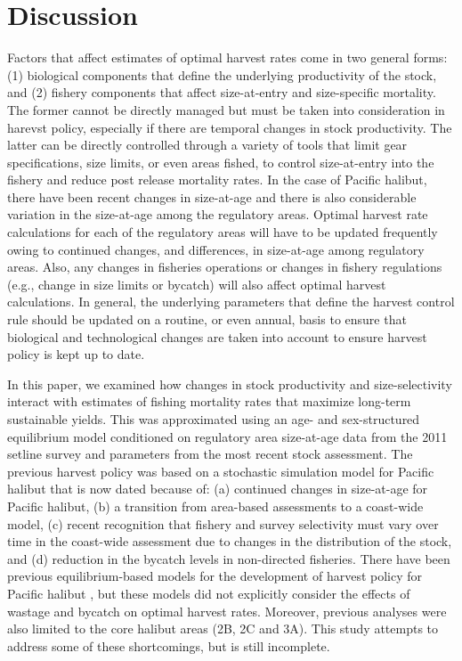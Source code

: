 

\section*{Discussion} %
\label{sec:discussion}

Factors that affect estimates of optimal harvest rates come in two general forms: (1) biological components that define the underlying productivity of the stock, and (2) fishery components that affect size-at-entry and size-specific mortality. The former cannot be directly managed but must be taken into consideration in harevst policy, especially if there are temporal changes in stock productivity.  The latter can be directly controlled through a variety of tools that limit gear specifications, size limits, or even areas fished, to control size-at-entry into the fishery and reduce post release mortality rates.  In the case of Pacific halibut, there have been recent changes in size-at-age and there is also considerable variation in the size-at-age among the regulatory areas. Optimal harvest rate calculations for each of the regulatory areas will have to be updated frequently owing to continued changes, and differences, in size-at-age among regulatory areas.  Also, any changes in fisheries operations or changes in fishery regulations (e.g., change in size limits or bycatch) will also affect optimal harvest calculations.  In general, the underlying parameters that define the harvest control rule should be updated on a routine, or even annual, basis to ensure that biological and technological changes are taken into account to ensure harvest policy is kept up to date.

In this paper, we examined how changes in stock productivity and size-selectivity interact with estimates of fishing mortality rates that maximize long-term sustainable yields.  This was approximated using an age- and sex-structured equilibrium model conditioned on regulatory area size-at-age data from the 2011 setline survey and parameters from the most recent stock assessment.  The previous harvest policy was based on a stochastic simulation model for Pacific halibut that is now dated because of: (a) continued changes in size-at-age for Pacific halibut, (b) a transition from area-based assessments to a coast-wide model, (c) recent recognition that fishery and survey selectivity must vary over time in the coast-wide assessment due to changes in the distribution of the stock, and (d) reduction in the bycatch levels in non-directed fisheries.  There have been previous equilibrium-based models for the development of harvest policy for Pacific halibut \citep[e.g.,][]{clark1995re}, but these models did not explicitly consider the effects of wastage and bycatch on optimal harvest rates.  Moreover, previous analyses were also limited to the core halibut areas (2B, 2C and 3A).  This study attempts to address some of these shortcomings, but is still incomplete.


